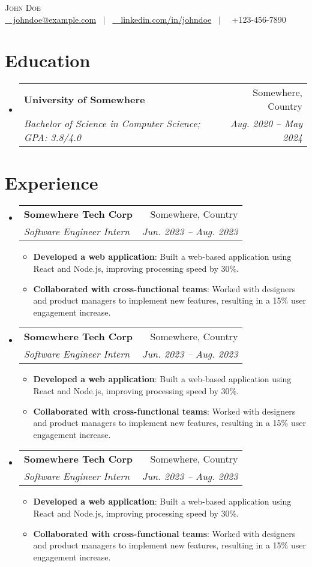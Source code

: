 \documentclass[a4paper,10pt]{article}
\makeatletter
\newcommand{\resumeItem}[2]{
  \item\small{
    \textbf{#1}{: #2 \vspace{-2pt}}
  }
}
\newcommand{\resumeSubheading}[4]{
  \vspace{-2pt}\item
    \begin{tabular*}{0.97\textwidth}[t]{l@{\extracolsep{\fill}}r}
      \textbf{#1} & #2 \\
      \textit{#3} & \textit{#4} \\
    \end{tabular*}\vspace{-7pt}
}
\newcommand{\resumeSubHeadingListStart}{\begin{itemize}[leftmargin=0.15in, label={}]}
\newcommand{\resumeSubHeadingListEnd}{\end{itemize}\vspace{-12pt}}
\newcommand{\resumeItemListStart}{\begin{itemize}}
\newcommand{\resumeItemListEnd}{\end{itemize}\vspace{-12pt}}
\makeatother
\begin{document}
\begin{center}
    {\Huge \scshape John Doe} \\ \vspace{1pt}
    \small \href{mailto:johndoe@example.com}{\faEnvelope \ \ johndoe@example.com} \ $|$ \
    \href{https://linkedin.com/in/johndoe}{\faLinkedin \ \ linkedin.com/in/johndoe} \ $|$ \
    \faPhone \ +123-456-7890
\end{center}

\section{Education}
  \resumeSubHeadingListStart
    \resumeSubheading
      {University of Somewhere}{Somewhere, Country}
      {Bachelor of Science in Computer Science; GPA: 3.8/4.0}{Aug. 2020 -- May 2024}
  \resumeSubHeadingListEnd

\section{Experience}
  \resumeSubHeadingListStart
    \resumeSubheading
      {Somewhere Tech Corp}{Somewhere, Country}
      {Software Engineer Intern}{Jun. 2023 -- Aug. 2023}
      \resumeItemListStart
        \resumeItem{Developed a web application}
          {Built a web-based application using React and Node.js, improving processing speed by 30\%.}
        \resumeItem{Collaborated with cross-functional teams}
          {Worked with designers and product managers to implement new features, resulting in a 15\% user engagement increase.}
      \resumeItemListEnd
    \vspace{20pt}
      \resumeSubheading
      {Somewhere Tech Corp}{Somewhere, Country}
      {Software Engineer Intern}{Jun. 2023 -- Aug. 2023}
      \resumeItemListStart
        \resumeItem{Developed a web application}
          {Built a web-based application using React and Node.js, improving processing speed by 30\%.}
        \resumeItem{Collaborated with cross-functional teams}
          {Worked with designers and product managers to implement new features, resulting in a 15\% user engagement increase.}
      \resumeItemListEnd
\vspace{20pt}
      \resumeSubheading
      {Somewhere Tech Corp}{Somewhere, Country}
      {Software Engineer Intern}{Jun. 2023 -- Aug. 2023}
      \resumeItemListStart
        \resumeItem{Developed a web application}
          {Built a web-based application using React and Node.js, improving processing speed by 30\%.}
        \resumeItem{Collaborated with cross-functional teams}
          {Worked with designers and product managers to implement new features, resulting in a 15\% user engagement increase.}
      \resumeItemListEnd
  \resumeSubHeadingListEnd
\end{document}
